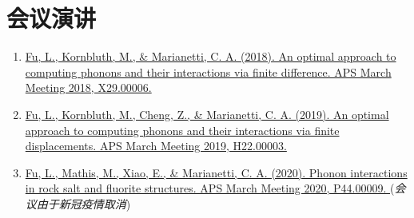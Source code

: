 \documentclass[
  a4paper,
  12pt
]{cv}
\begin{document}
\section{会议演讲}

\begin{enumerate}
\item
\href{https://meetings.aps.org/Meeting/MAR18/Event/322388}{
Fu, L., Kornbluth, M., \& Marianetti, C. A. (2018).
An optimal approach to computing phonons and their interactions via finite difference.
APS March Meeting 2018, X29.00006.
}
%
\item
\href{https://meetings.aps.org/Meeting/MAR19/Session/H22.3}{
Fu, L., Kornbluth, M., Cheng, Z., \& Marianetti, C. A. (2019).
An optimal approach to computing phonons and their interactions via finite displacements.
APS March Meeting 2019, H22.00003.
}
%
\item
\href{https://meetings.aps.org/Meeting/MAR20/Session/P44.9}{
Fu, L., Mathis, M., Xiao, E., \& Marianetti, C. A. (2020).
Phonon interactions in rock salt and fluorite structures.
APS March Meeting 2020, P44.00009.
} (\emph{会议由于新冠疫情取消})
\end{enumerate}
\end{document}
